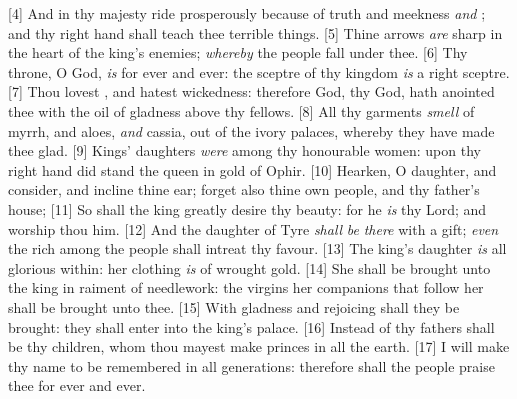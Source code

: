 [4] \textcolor[cmyk]{0.99998,1,0,0}{And in thy majesty ride prosperously because of truth and meekness \emph{and} ; and thy right hand shall teach thee terrible things.}
[5] \textcolor[cmyk]{0.99998,1,0,0}{Thine arrows \emph{are} sharp in the heart of the king's enemies; \emph{whereby} the people fall under thee.}
[6] \textcolor[cmyk]{0.99998,1,0,0}{Thy throne, O God, \emph{is} for ever and ever: the sceptre of thy kingdom \emph{is} a right sceptre.}
[7] \textcolor[cmyk]{0.99998,1,0,0}{Thou lovest , and hatest wickedness: therefore God, thy God, hath anointed thee with the oil of gladness above thy fellows.}
[8] \textcolor[cmyk]{0.99998,1,0,0}{All thy garments \emph{smell} of myrrh, and aloes, \emph{and} cassia, out of the ivory palaces, whereby they have made thee glad.}
[9] \textcolor[cmyk]{0.99998,1,0,0}{Kings' daughters \emph{were} among thy honourable women: upon thy right hand did stand the queen in gold of Ophir.}
[10] \textcolor[cmyk]{0.99998,1,0,0}{Hearken, O daughter, and consider, and incline thine ear; forget also thine own people, and thy father's house;}
[11] \textcolor[cmyk]{0.99998,1,0,0}{So shall the king greatly desire thy beauty: for he \emph{is} thy Lord; and worship thou him.}
[12] \textcolor[cmyk]{0.99998,1,0,0}{And the daughter of Tyre \emph{shall} \emph{be} \emph{there} with a gift; \emph{even} the rich among the people shall intreat thy favour.}
[13] \textcolor[cmyk]{0.99998,1,0,0}{The king's daughter \emph{is} all glorious within: her clothing \emph{is} of wrought gold.}
[14] \textcolor[cmyk]{0.99998,1,0,0}{She shall be brought unto the king in raiment of needlework: the virgins her companions that follow her shall be brought unto thee.}
[15] \textcolor[cmyk]{0.99998,1,0,0}{With gladness and rejoicing shall they be brought: they shall enter into the king's palace.}
[16] \textcolor[cmyk]{0.99998,1,0,0}{Instead of thy fathers shall be thy children, whom thou mayest make princes in all the earth.}
[17] \textcolor[cmyk]{0.99998,1,0,0}{I will make thy name to be remembered in all generations: therefore shall the people praise thee for ever and ever.}

